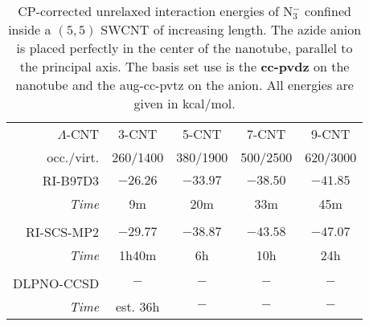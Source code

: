 \documentclass{article}
\begin{document}
\begin{table}
    \centering
    \begin{tabular}{r cccc}
        \toprule
        $\Lambda$-CNT & 3-CNT     & 5-CNT     & 7-CNT      & 9-CNT    \\
        occ./virt.    & 260/1400  & 380/1900  & 500/2500   & 620/3000 \\
        \midrule
        RI-B97D3      & $-26.26$  & $-33.97$  & $-38.50$   & $-41.85$ \\
        \textit{Time} & 9m        & 20m       & 33m        & 45m \\
        \vspace{1mm} \\
        RI-SCS-MP2    & $-29.77$  & $-38.87$  & $-43.58$   & $-47.07$ \\
        \textit{Time} & 1h40m     & 6h        & 10h        & 24h \\
        \vspace{1mm} \\
        DLPNO-CCSD    & $-$       & $-$       & $-$        & $-$ \\
        \textit{Time} & est. 36h  & $-$       & $-$        & $-$ \\
        \bottomrule
    \end{tabular}
    \caption{CP-corrected unrelaxed interaction energies of N$_3^-$ confined inside a $(5,5)$ SWCNT of increasing length. The azide anion is placed perfectly in the center of the nanotube, parallel to the principal axis. The basis set use is the \textbf{cc-pvdz} on the nanotube and the aug-cc-pvtz on the anion. All energies are given in kcal/mol.}
\label{tab:eint_cnt55x_cc-pvdz}
\end{table}
%
\end{document}
